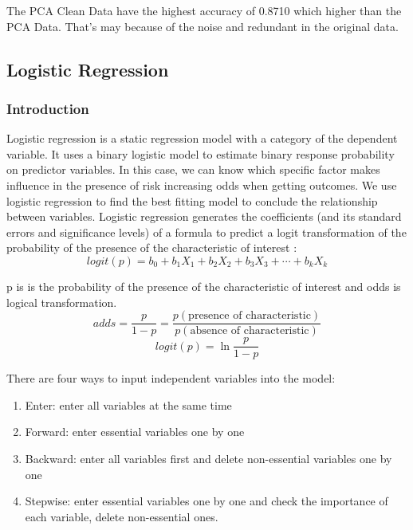 \documentclass[sigconf]{acmart}
\begin{document}
The PCA Clean Data have the highest accuracy of 0.8710 which higher than the PCA Data. That's may because of the noise and redundant in the original data. 

\subsection{Logistic Regression}

\subsubsection{Introduction}

Logistic regression is a static regression model with a category of the dependent variable. It uses a binary logistic model to estimate binary response probability on predictor variables. In this case, we can know which specific factor makes influence in the presence of risk increasing odds when getting outcomes. We use logistic regression to find the best fitting model to conclude the relationship between variables. Logistic regression generates the coefficients (and its standard errors and significance levels) of a formula to predict a logit transformation of the probability of the presence of the characteristic of interest \cite{lr.form}:
\begin{equation*}
    logit(p)= b_0 + b_1X_1 + b_2X_2 + b_3X_3 + \cdots + b_kX_k
\end{equation*}

p is is the probability of the presence of the characteristic of interest and odds is logical transformation.
\begin{equation*}
    adds= \frac{p}{1-p}=\frac{p(\text{presence of characteristic})}{p(\text{absence of characteristic})}
\end{equation*}
\begin{equation*}
     logit(p)=\ln{\frac{p}{1-p}}
\end{equation*}

There are four ways to input independent variables into the model:
\begin{enumerate}
    \item Enter: enter all variables at the same time
    \item Forward: enter essential variables one by one
    \item Backward: enter all variables first and delete non-essential variables one by one
    \item Stepwise: enter essential variables one by one and check the importance of each variable, delete non-essential ones.
\end{enumerate}
\end{document}
